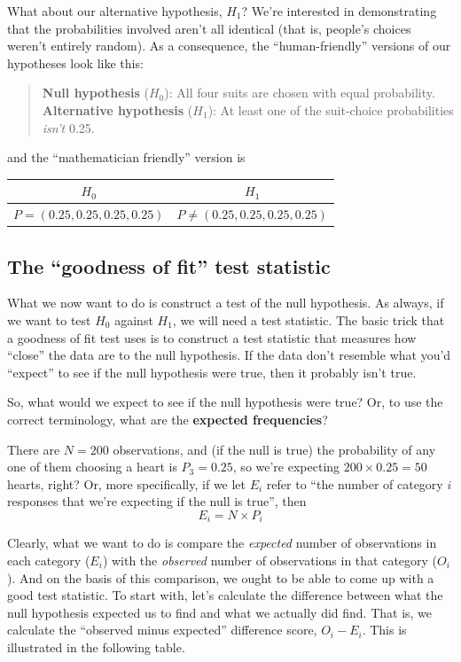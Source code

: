 \documentclass[
  11pt,
  a4paper,
  twoside,symmetric,openright]{book}
\theoremstyle{break}
\theoremstyle{break}
\begin{document}
What about our alternative hypothesis, \(H_1\)? We're interested in demonstrating that the probabilities involved aren't all identical (that is, people's choices weren't entirely random). As a consequence, the ``human-friendly'' versions of our hypotheses look like this:

\begin{quote}
\textbf{Null hypothesis} (\(H_0\)): All four suits are chosen with equal probability.\\
\textbf{Alternative hypothesis} (\(H_1\)): At least one of the suit-choice probabilities \emph{isn't} 0.25.
\end{quote}

and the ``mathematician friendly'' version is

\begin{longtable}[]{@{}cc@{}}
\toprule\noalign{}
\(H_0\) & \(H_1\) \\
\midrule\noalign{}
\endhead
\bottomrule\noalign{}
\endlastfoot
\(P = (0.25, 0.25, 0.25, 0.25)\) & \(P \neq (0.25,0.25,0.25,0.25)\) \\
\end{longtable}

\subsection{The ``goodness of fit'' test statistic}\label{the-goodness-of-fit-test-statistic}

What we now want to do is construct a test of the null hypothesis. As always, if we want to test \(H_0\) against \(H_1\), we will need a test statistic. The basic trick that a goodness of fit test uses is to construct a test statistic that measures how ``close'' the data are to the null hypothesis. If the data don't resemble what you'd ``expect'' to see if the null hypothesis were true, then it probably isn't true.

So, what would we expect to see if the null hypothesis were true? Or, to use the correct terminology, what are the \textbf{expected frequencies}?

There are \(N=200\) observations, and (if the null is true) the probability of any one of them choosing a heart is \(P_3 = 0.25\), so we're expecting \(200 \times 0.25 = 50\) hearts, right? Or, more specifically, if we let \(E_i\) refer to ``the number of category \(i\) responses that we're expecting if the null is true'', then
\[
E_i = N \times P_i
\]

Clearly, what we want to do is compare the \emph{expected} number of observations in each category (\(E_i\)) with the \emph{observed} number of observations in that category (\(O_i\)). And on the basis of this comparison, we ought to be able to come up with a good test statistic. To start with, let's calculate the difference between what the null hypothesis expected us to find and what we actually did find. That is, we calculate the ``observed minus expected'' difference score, \(O_i - E_i\). This is illustrated in the following table.
\end{document}
